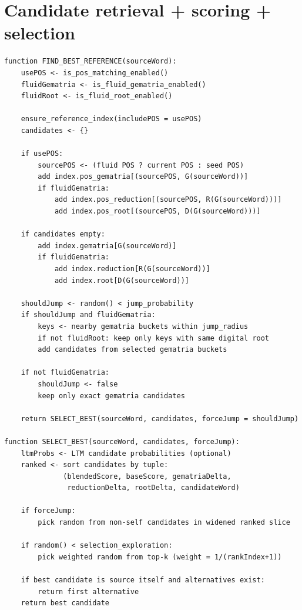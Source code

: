 \documentclass[11pt,a4paper]{report}
\begin{document}
\section{Candidate retrieval + scoring + selection}
\begin{lstlisting}[style=pseudocode]
function FIND_BEST_REFERENCE(sourceWord):
    usePOS <- is_pos_matching_enabled()
    fluidGematria <- is_fluid_gematria_enabled()
    fluidRoot <- is_fluid_root_enabled()

    ensure_reference_index(includePOS = usePOS)
    candidates <- {}

    if usePOS:
        sourcePOS <- (fluid POS ? current POS : seed POS)
        add index.pos_gematria[(sourcePOS, G(sourceWord))]
        if fluidGematria:
            add index.pos_reduction[(sourcePOS, R(G(sourceWord)))]
            add index.pos_root[(sourcePOS, D(G(sourceWord)))]

    if candidates empty:
        add index.gematria[G(sourceWord)]
        if fluidGematria:
            add index.reduction[R(G(sourceWord))]
            add index.root[D(G(sourceWord))]

    shouldJump <- random() < jump_probability
    if shouldJump and fluidGematria:
        keys <- nearby gematria buckets within jump_radius
        if not fluidRoot: keep only keys with same digital root
        add candidates from selected gematria buckets

    if not fluidGematria:
        shouldJump <- false
        keep only exact gematria candidates

    return SELECT_BEST(sourceWord, candidates, forceJump = shouldJump)

function SELECT_BEST(sourceWord, candidates, forceJump):
    ltmProbs <- LTM candidate probabilities (optional)
    ranked <- sort candidates by tuple:
              (blendedScore, baseScore, gematriaDelta,
               reductionDelta, rootDelta, candidateWord)

    if forceJump:
        pick random from non-self candidates in widened ranked slice

    if random() < selection_exploration:
        pick weighted random from top-k (weight = 1/(rankIndex+1))

    if best candidate is source itself and alternatives exist:
        return first alternative
    return best candidate
\end{lstlisting}
\end{document}
